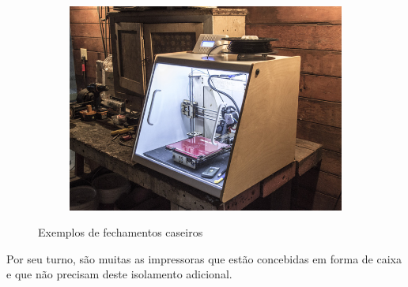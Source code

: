 \documentclass[11pt,a4paper]{article}
\begin{document}
\begin{figure}[H]
\begin{subfigure}[b]{0.3\textwidth}
    \end{subfigure}
    \quad %
    \begin{subfigure}[b]{0.3\textwidth}
        \includegraphics[width=\textwidth,cfbox=azul_marcos 4pt 0pt]{FOTOS/CERRAMIENTO3}
    \end{subfigure}
    \caption*{Exemplos de fechamentos caseiros}
\end{figure}
Por seu turno, são muitas as impressoras que estão concebidas em forma de caixa e que não precisam deste isolamento adicional.
\end{document}
